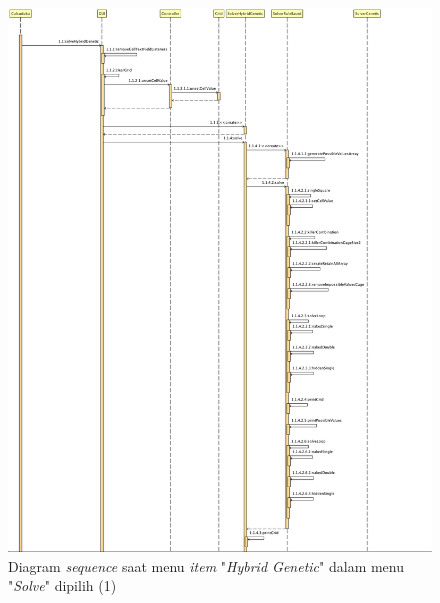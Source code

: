 \begin{figure}
\centering
\captionsetup{justification=centering}
\includegraphics[scale=0.333]{Gambar/Analisis/SequenceDiagramHybridGenetic1.png}
\caption[Diagram \textit{sequence} saat menu \textit{item} "\textit{Hybrid Genetic}" dalam menu "\textit{Solve}" dipilih (1)]{Diagram \textit{sequence} saat menu \textit{item} "\textit{Hybrid Genetic}" dalam menu "\textit{Solve}" dipilih (1)}
\label{fig:sequencehg1}
\end{figure}

